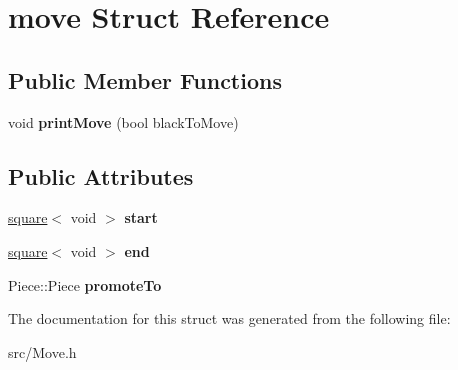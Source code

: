 \hypertarget{structmove}{}\section{move Struct Reference}
\label{structmove}
\subsection*{Public Member Functions}
\begin{DoxyCompactItemize}
\item 
\mbox{\label{structmove_a1586ed1c5f7173c4b60fa306522e4f64}} 
void {\bfseries print\+Move} (bool black\+To\+Move)
\end{DoxyCompactItemize}
\subsection*{Public Attributes}
\begin{DoxyCompactItemize}
\item 
\mbox{\label{structmove_a3f8a82f7c7bc55f55874026ac254cd85}} 
\hyperlink{structsquare}{square}$<$ void $>$ {\bfseries start}
\item 
\mbox{\label{structmove_a205ae16ec975ed71eb4233bb38d21a75}} 
\hyperlink{structsquare}{square}$<$ void $>$ {\bfseries end}
\item 
\mbox{\label{structmove_a87fc4fc521c961cce03613dcb6cd0c6b}} 
Piece\+::\+Piece {\bfseries promote\+To}
\end{DoxyCompactItemize}


The documentation for this struct was generated from the following file\+:\begin{DoxyCompactItemize}
\item 
src/Move.\+h\end{DoxyCompactItemize}

